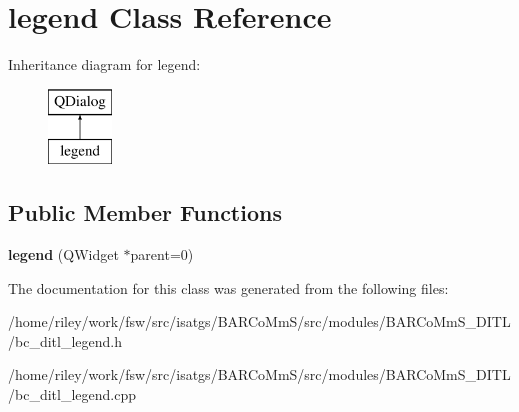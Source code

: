\hypertarget{classlegend}{}\section{legend Class Reference}
\label{classlegend}
Inheritance diagram for legend\+:\begin{figure}[H]
\begin{center}
\leavevmode
\includegraphics[height=2.000000cm]{classlegend}
\end{center}
\end{figure}
\subsection*{Public Member Functions}
\begin{DoxyCompactItemize}
\item 
{\bfseries legend} (Q\+Widget $\ast$parent=0)\hypertarget{classlegend_a5f291b6d76d65ec55d7a4aebe7ac4f09}{}\label{classlegend_a5f291b6d76d65ec55d7a4aebe7ac4f09}

\end{DoxyCompactItemize}


The documentation for this class was generated from the following files\+:\begin{DoxyCompactItemize}
\item 
/home/riley/work/fsw/src/isatgs/\+B\+A\+R\+Co\+Mm\+S/src/modules/\+B\+A\+R\+Co\+Mm\+S\+\_\+\+D\+I\+T\+L/bc\+\_\+ditl\+\_\+legend.\+h\item 
/home/riley/work/fsw/src/isatgs/\+B\+A\+R\+Co\+Mm\+S/src/modules/\+B\+A\+R\+Co\+Mm\+S\+\_\+\+D\+I\+T\+L/bc\+\_\+ditl\+\_\+legend.\+cpp\end{DoxyCompactItemize}
